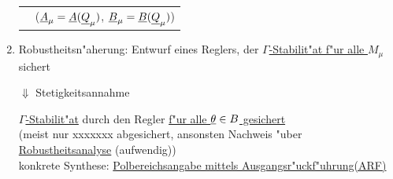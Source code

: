 \documentclass[openany,a4paper,11pt]{book}
\begin{document}
\begin{enumerate}
{\begin{tabular}{ll}
	    & ($\uline{A}_\mu=\uline{A}(\uline{Q}_\mu)$, $\uline{B}_\mu=\uline{B}(\uline{Q}_\mu)$)
	\end{tabular}}
	\item Robustheitsn"aherung: Entwurf eines Reglers, der \uline{$\Gamma$-Stabilit"at f"ur alle $M_\mu$} sichert\\
	\begin{centering}
	$\Downarrow$ Stetigkeitsannahme\\
	\end{centering}
	\uline{$\Gamma$-Stabilit"at} durch den Regler \uline{f"ur alle $\uline{\theta}\in B$ gesichert}\\
	(meist nur xxxxxxx abgesichert, ansonsten Nachweis "uber \uline{Robustheitsanalyse} (aufwendig))\\
	konkrete Synthese: \uline{Polbereichsangabe mittels Ausgangsr"uckf"uhrung(ARF)}
\end{enumerate}
\end{document}
